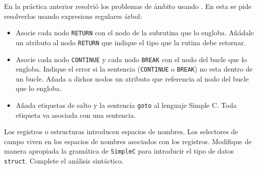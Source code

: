 \label{practica:identificaciondelosnombrestreereg}
En la práctica anterior resolvió los problemas de ámbito usando .
En esta se pide resolverlos usando expresions regulares árbol:
\begin{itemize}
\item
Asocie cada nodo \verb|RETURN| con el nodo de la subrutina que lo engloba.
Añádale un atributo al nodo \verb|RETURN| que indique el tipo que la rutina debe retornar.
\item
Asocie cada nodo \verb|CONTINUE| y cada nodo \verb|BREAK| con el nodo
del bucle que lo engloba. Indique el error si la sentencia (\verb|CONTINUE|
o \verb|BREAK|) no esta dentro de un bucle. Añada  a dichos nodos
un atributo 
que referencia al nodo del bucle que lo engloba.
\item
Añada etiquetas de salto y la sentencia \verb|goto| al lenguaje Simple C.
Toda etiqueta va asociada con una sentencia.

\end{itemize}

\label{practica:structsscope}
Los registros o estructuras introducen espacios de nombres.
Los selectores de campo viven en los espacios de
nombres asociados con los registros.
Modifique de manera apropiada la gramática de 
\verb|SimpleC| para introducir el tipo de datos \verb|struct|.
Complete el análisis sintáctico.

